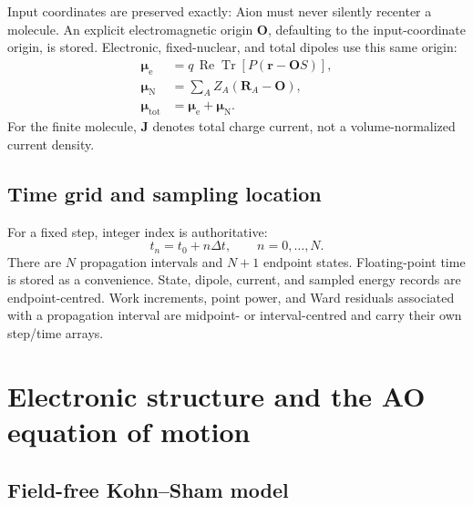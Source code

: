 \documentclass[11pt]{article}
\newcommand{\ReTr}{\operatorname{Re}\operatorname{Tr}}
\newcommand{\vect}[1]{\bm{#1}}
\begin{document}
Input coordinates are preserved exactly: Aion must never silently recenter a
molecule. An explicit electromagnetic origin \(\vect O\), defaulting to the
input-coordinate origin, is stored. Electronic, fixed-nuclear, and total
dipoles use this same origin:
\begin{align}
 \vect\mu_{\mathrm e}
   &=q\,\ReTr\!\left[P(\vect r-\vect O S)\right],\\
 \vect\mu_{\mathrm N}
   &=\sum_A Z_A(\vect R_A-\vect O),\\
 \vect\mu_{\mathrm{tot}}
   &=\vect\mu_{\mathrm e}+\vect\mu_{\mathrm N}.
\end{align}
For the finite molecule, \(\vect J\) denotes total charge current, not a
volume-normalized current density.

\subsection{Time grid and sampling location}

For a fixed step, integer index is authoritative:
\begin{equation}
 t_n=t_0+n\Delta t,\qquad n=0,\ldots,N.
\end{equation}
There are \(N\) propagation intervals and \(N+1\) endpoint states.
Floating-point time is stored as a convenience. State, dipole, current, and
sampled energy records are endpoint-centred. Work increments, point power,
and Ward residuals associated with a propagation interval are midpoint- or
interval-centred and carry their own step/time arrays.

\section{Electronic structure and the AO equation of motion}

\subsection{Field-free Kohn--Sham model}
\end{document}
